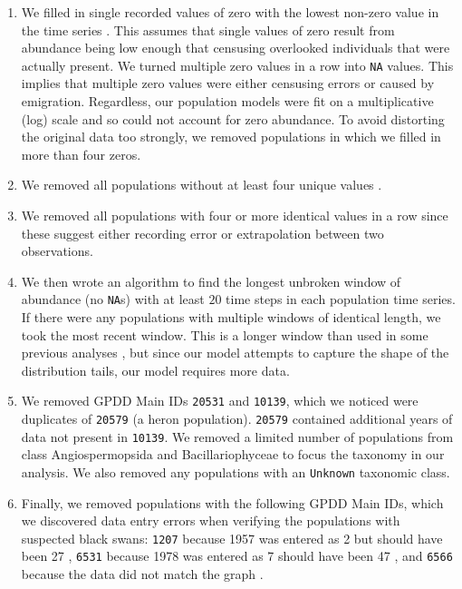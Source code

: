 \begin{enumerate}
\item We filled in single recorded values of zero with the lowest non-zero value in the time series \citep[following][]{brook2006a}. This assumes that single values of zero result from abundance being low enough that censusing overlooked individuals that were actually present. We turned multiple zero values in a row into \texttt{NA} values. This implies that multiple zero values were either censusing errors or caused by emigration. Regardless, our population models were fit on a multiplicative (log) scale and so could not account for zero abundance. To avoid distorting the original data too strongly, we removed populations in which we filled in more than four zeros.

\item We removed all populations without at least four unique values \citep[following][]{brook2006a}.

\item We removed all populations with four or more identical values in a row since these suggest either recording error or extrapolation between two observations.

\item We then wrote an algorithm to find the longest unbroken window of abundance (no \texttt{NA}s) with at least $20$ time steps in each population time series. If there were any populations with multiple windows of identical length, we took the most recent window. This is a longer window than used in some previous analyses \citep[e.g.][]{brook2006a}, but since our model attempts to capture the shape of the distribution tails, our model requires more data.

\item We removed GPDD Main IDs \texttt{20531} and \texttt{10139}, which we noticed were duplicates of \texttt{20579} (a heron population). \texttt{20579} contained additional years of data not present in \texttt{10139}. We removed a limited number of populations from class Angiospermopsida and Bacillariophyceae to focus the taxonomy in our analysis. We also removed any populations with an \texttt{Unknown} taxonomic class.

\item Finally, we removed populations with the following GPDD Main IDs, which we discovered data entry errors when verifying the populations with suspected black swans: \texttt{1207} because 1957 was entered as 2 but should have been 27 \citep{kendeigh1982}, \texttt{6531} because 1978 was entered as 7 should have been 47 \citep{minot1986}, and \texttt{6566} because the data did not match the graph \citep{heessen1996}.

\end{enumerate}

